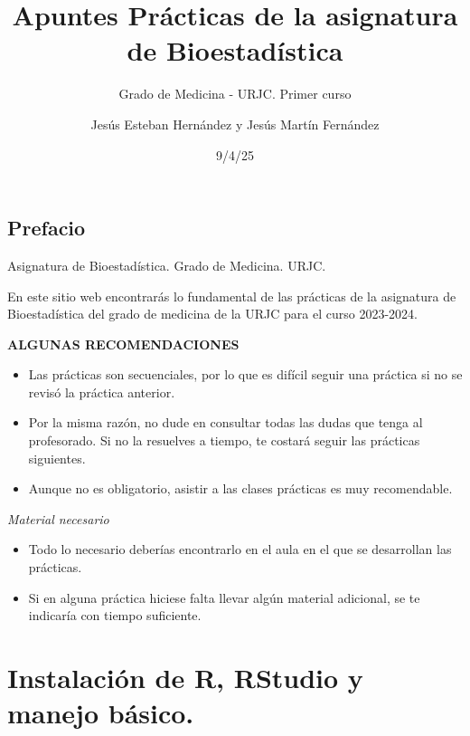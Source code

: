 \documentclass[
  letterpaper,
]{scrbook}
\title{Apuntes Prácticas de la asignatura de Bioestadística}
\subtitle{Grado de Medicina - URJC. Primer curso}
\author{Jesús Esteban Hernández y Jesús Martín Fernández}
\date{9/4/25}
\renewcommand*\contentsname{Tabla de contenidos}
\newcommand\contentsname{Tabla de contenidos}
\begin{document}
\frontmatter
\maketitle
\ifdefined\Shaded\renewenvironment{Shaded}{\begin{tcolorbox}[sharp corners, boxrule=0pt, borderline west={3pt}{0pt}{shadecolor}, enhanced, interior hidden, frame hidden, breakable]}{\end{tcolorbox}}\fi

\renewcommand*\contentsname{Tabla de contenidos}
{
\setcounter{tocdepth}{2}
\tableofcontents
}
\mainmatter
{}

\hypertarget{prefacio}{%
\chapter{\texorpdfstring{{Prefacio}}{Prefacio}}\label{prefacio}}

Asignatura de Bioestadística. Grado de Medicina. URJC.

\hfill\break

En este sitio web encontrarás lo fundamental de las prácticas de la
asignatura de Bioestadística del grado de medicina de la URJC para el
curso 2023-2024.

\textbf{ALGUNAS RECOMENDACIONES}

\begin{itemize}
\item
  Las prácticas son secuenciales, por lo que es difícil seguir una
  práctica si no se revisó la práctica anterior.
\item
  Por la misma razón, no dude en consultar todas las dudas que tenga al
  profesorado. Si no la resuelves a tiempo, te costará seguir las
  prácticas siguientes.
\item
  Aunque no es obligatorio, asistir a las clases prácticas es muy
  recomendable.
\end{itemize}

\emph{Material necesario}

\begin{itemize}
\item
  Todo lo necesario deberías encontrarlo en el aula en el que se
  desarrollan las prácticas.
\item
  Si en alguna práctica hiciese falta llevar algún material adicional,
  se te indicaría con tiempo suficiente.
\end{itemize}

\part{Instalación de R, RStudio y manejo básico.}
\end{document}
